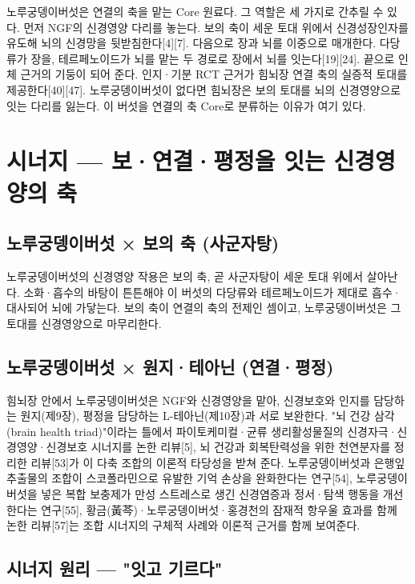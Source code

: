 \documentclass[12pt,oneside]{book}
\begin{document}
노루궁뎅이버섯은 연결의 축을 맡는 Core 원료다. 그 역할은 세 가지로 간추릴 수 있다. 먼저 NGF의 신경영양 다리를 놓는다. 보의 축이 세운 토대 위에서 신경성장인자를 유도해 뇌의 신경망을 뒷받침한다[4][7]. 다음으로 장과 뇌를 이중으로 매개한다. 다당류가 장을, 테르페노이드가 뇌를 맡는 두 경로로 장에서 뇌를 잇는다[19][24]. 끝으로 인체 근거의 기둥이 되어 준다. 인지·기분 RCT 근거가 힘뇌장 연결 축의 실증적 토대를 제공한다[40][47]. 노루궁뎅이버섯이 없다면 힘뇌장은 보의 토대를 뇌의 신경영양으로 잇는 다리를 잃는다. 이 버섯을 연결의 축 Core로 분류하는 이유가 여기 있다.

\section{시너지 — 보·연결·평정을 잇는 신경영양의 축}

\subsection{노루궁뎅이버섯 × 보의 축 (사군자탕)}

노루궁뎅이버섯의 신경영양 작용은 보의 축, 곧 사군자탕이 세운 토대 위에서 살아난다. 소화·흡수의 바탕이 튼튼해야 이 버섯의 다당류와 테르페노이드가 제대로 흡수·대사되어 뇌에 가닿는다. 보의 축이 연결의 축의 전제인 셈이고, 노루궁뎅이버섯은 그 토대를 신경영양으로 마무리한다.

\subsection{노루궁뎅이버섯 × 원지·테아닌 (연결·평정)}

힘뇌장 안에서 노루궁뎅이버섯은 NGF와 신경영양을 맡아, 신경보호와 인지를 담당하는 원지(제9장), 평정을 담당하는 L-테아닌(제10장)과 서로 보완한다. "뇌 건강 삼각(brain health triad)"이라는 틀에서 파이토케미컬·균류 생리활성물질의 신경자극·신경영양·신경보호 시너지를 논한 리뷰[5], 뇌 건강과 회복탄력성을 위한 천연분자를 정리한 리뷰[53]가 이 다축 조합의 이론적 타당성을 받쳐 준다. 노루궁뎅이버섯과 은행잎 추출물의 조합이 스코폴라민으로 유발한 기억 손상을 완화한다는 연구[54], 노루궁뎅이버섯을 넣은 복합 보충제가 만성 스트레스로 생긴 신경염증과 정서·탐색 행동을 개선한다는 연구[55], 황금(黃芩)·노루궁뎅이버섯·홍경천의 잠재적 항우울 효과를 함께 논한 리뷰[57]는 조합 시너지의 구체적 사례와 이론적 근거를 함께 보여준다.

\subsection{시너지 원리 — "잇고 기르다"}
\end{document}
